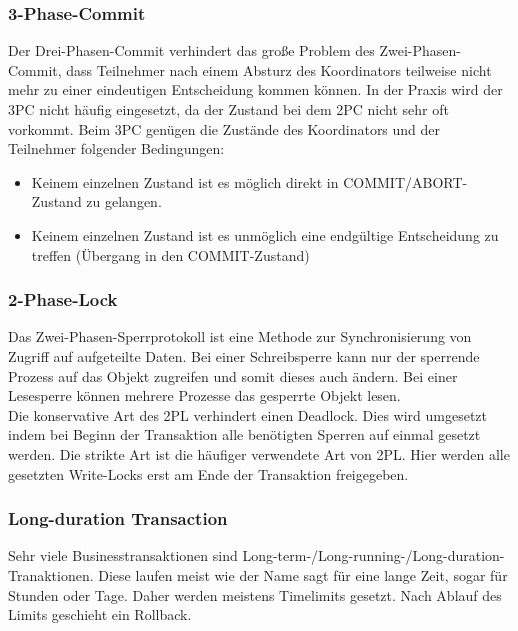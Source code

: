 \documentclass[letterpaper, 12pt]{article}
\let\tempsubsubsection\subsubsection
\renewcommand\subsubsection[1]{\vspace{0cm}\tempsubsubsection{#1}\vspace{0cm}}
\begin{document}
\subsubsection{3-Phase-Commit}

Der Drei-Phasen-Commit verhindert das große Problem des Zwei-Phasen-Commit, dass Teilnehmer nach
einem Absturz des Koordinators teilweise nicht mehr zu einer eindeutigen Entscheidung
kommen können. In der Praxis wird der 3PC nicht häufig eingesetzt, da der Zustand bei dem
2PC nicht sehr oft vorkommt. Beim 3PC genügen die Zustände des Koordinators und der Teilnehmer
folgender Bedingungen:

\begin{itemize}
	\item Keinem einzelnen Zustand ist es möglich direkt in COMMIT/ABORT-Zustand zu gelangen.
	\item Keinem einzelnen Zustand ist es unmöglich eine endgültige Entscheidung zu treffen (Übergang
in den COMMIT-Zustand) \cite{ausarbeitungtra}
\end{itemize}

\subsubsection{2-Phase-Lock}

Das Zwei-Phasen-Sperrprotokoll ist eine Methode zur Synchronisierung von Zugriff auf aufgeteilte
Daten. Bei einer Schreibsperre kann nur der sperrende Prozess auf das Objekt zugreifen und somit dieses auch ändern. Bei einer Lesesperre können mehrere Prozesse das gesperrte Objekt lesen. \\
Die konservative Art des 2PL verhindert einen Deadlock. Dies wird umgesetzt indem bei Beginn der Transaktion
alle benötigten Sperren auf einmal gesetzt werden. Die strikte Art ist die häufiger verwendete
Art von 2PL. Hier werden alle gesetzten Write-Locks erst am Ende der Transaktion freigegeben. \cite{ausarbeitungtra}

\subsubsection{Long-duration Transaction}

Sehr viele Businesstransaktionen sind Long-term-/Long-running-/Long-duration-Tranaktionen. Diese
laufen meist wie der Name sagt für eine lange Zeit, sogar für Stunden oder Tage. Daher werden
meistens Timelimits gesetzt. Nach Ablauf des Limits geschieht ein Rollback. \cite{ausarbeitungtra}
\end{document}

